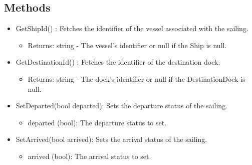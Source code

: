 \documentclass[12pt]{article}
\begin{document}
\subsection*{Methods}
\begin{itemize}
    \item GetShipId() : Fetches the identifier of the vessel associated with the sailing.
    \begin{itemize}
        \item Returns: string - The vessel's identifier or null if the Ship is null.
    \end{itemize}
    \item GetDestinationId() : Fetches the identifier of the destination dock.
    \begin{itemize}
        \item Returns: string - The dock's identifier or null if the DestinationDock is null.
    \end{itemize}
    \item SetDeparted(bool departed): Sets the departure status of the sailing.
    \begin{itemize}
        \item departed (bool): The departure status to set.
    \end{itemize}
    \item SetArrived(bool arrived): Sets the arrival status of the sailing.
    \begin{itemize}
        \item arrived (bool): The arrival status to set.
    \end{itemize}
\end{itemize}
\end{document}
